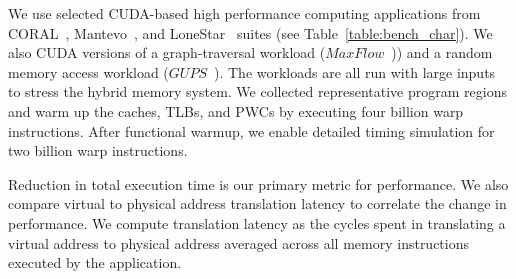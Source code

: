 \noindent We use selected CUDA-based high performance computing
applications from CORAL~\cite{CORAL}, Mantevo~\cite{mantevo}, and
LoneStar~\cite{lonestar} suites (see Table~\ref{table:bench_char}). We
also CUDA versions of a graph-traversal workload
($MaxFlow$~\cite{maxflow})) and a random memory access workload
($GUPS$~\cite{gups}). The workloads are all run with large inputs to
stress the hybrid memory system. We collected representative program
regions and warm up the caches, TLBs, and PWCs by executing four
billion warp instructions. After functional warmup, we enable detailed
timing simulation for two billion warp instructions.

Reduction in total execution time is our primary metric for
performance. We also compare virtual to physical address translation
latency to correlate the change in performance. We compute translation
latency as the cycles spent in translating a virtual address to
physical address averaged across all memory instructions executed by
the application.

